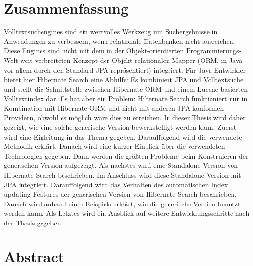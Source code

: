 \section*{Zusammenfassung}
Volltextsuchengines sind ein wertvolles Werkzeug um Suchergebnisse in Anwendungen zu verbessern, wenn relationale Datenbanken nicht ausreichen. Diese Engines sind nicht mit dem in der Objekt-orientierten Programmierungs-Welt weit verbreiteten Konzept der Objekt-relationalen Mapper (ORM, in Java vor allem durch den Standard JPA repräsentiert) integriert. Für Java Entwickler bietet hier Hibernate Search eine Abhilfe: Es kombiniert JPA und Volltextsuche und stellt die Schnittstelle zwischen Hibernate ORM und einem Lucene basierten Volltextindex dar. Es hat aber ein Problem: Hibernate Search funktioniert nur in Kombination mit Hibernate ORM und nicht mit anderen JPA konformen Providern, obwohl es möglich wäre dies zu erreichen. In dieser Thesis wird daher gezeigt, wie eine solche generische Version bewerkstelligt werden kann. Zuerst wird eine Einleitung in das Thema gegeben. Darauffolgend wird die verwendete Methodik erklärt. Danach wird eine kurzer Einblick über die verwendeten Technologien gegeben. Dann werden die größten Probleme beim Konstruieren der generischen Version aufgezeigt. Als nächstes wird eine Standalone Version von Hibernate Search beschrieben. Im Anschluss wird diese Standalone Version mit JPA integriert. Darauffolgend wird das Verhalten des automatischen Index updating Features der generischen Version von Hibernate Search beschrieben. Danach wird anhand eines Beispiels erklärt, wie die generische Version benutzt werden kann. Als Letztes wird ein Ausblick auf weitere Entwicklungsschritte nach der Thesis gegeben.

\pagebreak

\section*{Abstract}

